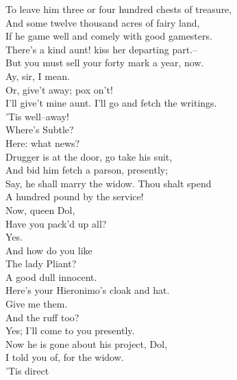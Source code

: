 \documentclass{memoir}
\begin{document}
\begin{drama*}
 To leave him three or four hundred chests of treasure,\\
 And some twelve thousand acres of fairy land,\\
 If he game well and comely with good gamesters.\\
\subtlespeaks  There's a kind aunt! kiss her departing part.--\\
 But you must sell your forty mark a year, now.\\
\dapperspeaks  Ay, sir, I mean.\\
\subtlespeaks {} Or, give't away; pox on't!\\
\dapperspeaks  I'll give't mine aunt. I'll go and fetch the writings.\\
\subtlespeaks  'Tis well--away!\\
\facespeaks {} Where's Subtle?\\
\subtlespeaks {} Here: what news?\\
\facespeaks  Drugger is at the door, go take his suit,\\
 And bid him fetch a parson, presently;\\
 Say, he shall marry the widow. Thou shalt spend\\
 A hundred pound by the service!\\
 Now, queen Dol,\\
 Have you pack'd up all?\\
\dolspeaks {} Yes.\\
\facespeaks {} And how do you like\\
 The lady Pliant?\\
\dolspeaks {} A good dull innocent.\\
\subtlespeaks  Here's your Hieronimo's cloak and hat.\\
\facespeaks  Give me them.\\
\subtlespeaks {} And the ruff too?\\
\facespeaks {} Yes; I'll come to you presently.\\
\subtlespeaks  Now he is gone about his project, Dol,\\
 I told you of, for the widow.\\
\dolspeaks {} 'Tis direct\\

\end{drama*}
\end{document}
